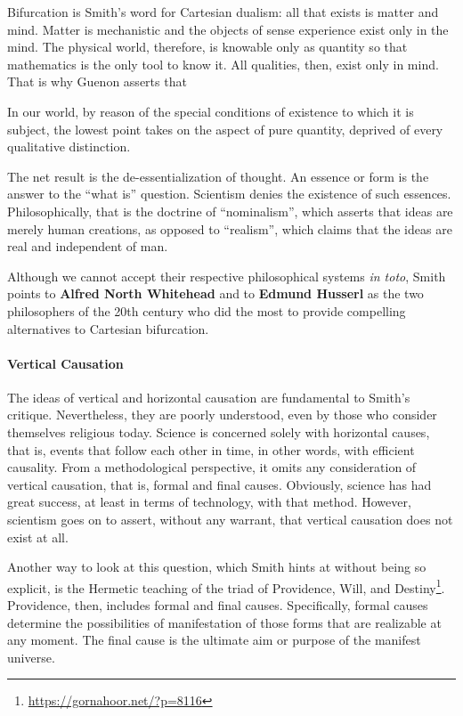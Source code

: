 Bifurcation is Smith's word for Cartesian dualism: all that exists is matter and mind. Matter is mechanistic and the objects of sense experience exist only in the mind. The physical world, therefore, is knowable only as quantity so that mathematics is the only tool to know it. All qualities, then, exist only in mind. That is why Guenon asserts that

\begin{quotex}
In our world, by reason of the special conditions of existence to which it is subject, the lowest point takes on the aspect of pure quantity, deprived of every qualitative distinction.
\end{quotex}


The net result is the de-essentialization of thought. An essence or form is the answer to the ``what is'' question. Scientism denies the existence of such essences. Philosophically, that is the doctrine of ``nominalism'', which asserts that ideas are merely human creations, as opposed to ``realism'', which claims that the ideas are real and independent of man.

Although we cannot accept their respective philosophical systems \emph{in toto}, Smith points to \textbf{Alfred North Whitehead} and to \textbf{Edmund Husserl} as the two philosophers of the 20th century who did the most to provide compelling alternatives to Cartesian bifurcation.

\paragraph{Vertical Causation}


The ideas of vertical and horizontal causation are fundamental to Smith's critique. Nevertheless, they are poorly understood, even by those who consider themselves religious today. Science is concerned solely with horizontal causes, that is, events that follow each other in time, in other words, with efficient causality. From a methodological perspective, it omits any consideration of vertical causation, that is, formal and final causes. Obviously, science has had great success, at least in terms of technology, with that method. However, scientism goes on to assert, without any warrant, that vertical causation does not exist at all.

Another way to look at this question, which Smith hints at without being so explicit, is the Hermetic teaching of the triad of Providence, Will, and Destiny\footnote{\url{https://gornahoor.net/?p=8116}}. Providence, then, includes formal and final causes. Specifically, formal causes determine the possibilities of manifestation of those forms that are realizable at any moment. The final cause is the ultimate aim or purpose of the manifest universe.


